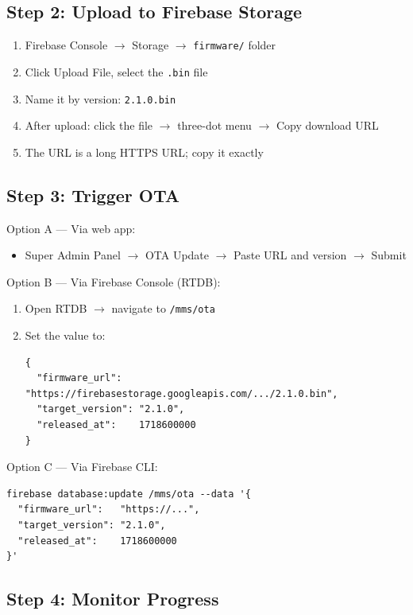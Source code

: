 \subsection{Step 2: Upload to Firebase Storage}

\begin{enumerate}[leftmargin=1.5em]
    \item Firebase Console $\rightarrow$ Storage $\rightarrow$ \texttt{firmware/} folder
    \item Click Upload File, select the \texttt{.bin} file
    \item Name it by version: \texttt{2.1.0.bin}
    \item After upload: click the file $\rightarrow$ three-dot menu $\rightarrow$ Copy download URL
    \item The URL is a long HTTPS URL; copy it exactly
\end{enumerate}

\subsection{Step 3: Trigger OTA}

Option A — Via web app:
\begin{itemize}[leftmargin=1.5em]
    \item Super Admin Panel $\rightarrow$ OTA Update $\rightarrow$ Paste URL and version $\rightarrow$ Submit
\end{itemize}

Option B — Via Firebase Console (RTDB):
\begin{enumerate}[leftmargin=1.5em]
    \item Open RTDB $\rightarrow$ navigate to \texttt{/mms/ota}
    \item Set the value to:
\begin{lstlisting}[style=jsonlstyle]
{
  "firmware_url":   "https://firebasestorage.googleapis.com/.../2.1.0.bin",
  "target_version": "2.1.0",
  "released_at":    1718600000
}
\end{lstlisting}
\end{enumerate}

Option C — Via Firebase CLI:
\begin{lstlisting}[style=bashstyle]
firebase database:update /mms/ota --data '{
  "firmware_url":   "https://...",
  "target_version": "2.1.0",
  "released_at":    1718600000
}'
\end{lstlisting}

\subsection{Step 4: Monitor Progress}

